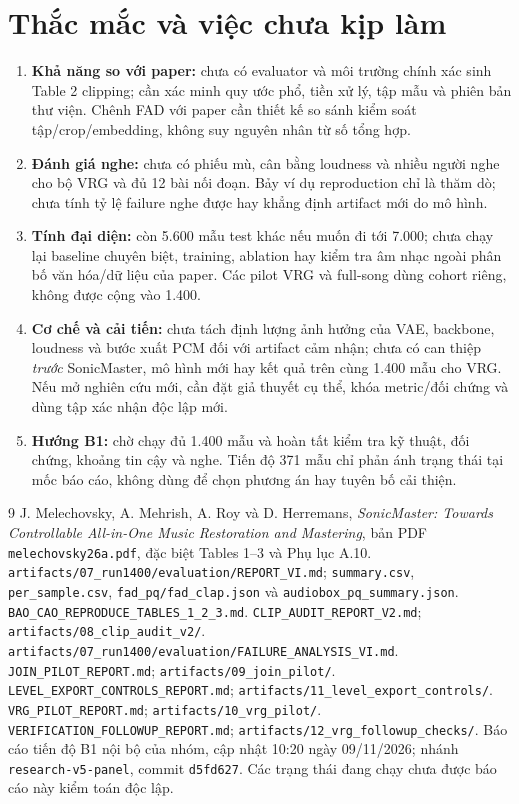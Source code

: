 \documentclass[10pt,a4paper]{article}
\begin{document}
\section{Thắc mắc và việc chưa kịp làm}
\begin{enumerate}
\item \textbf{Khả năng so với paper:} chưa có evaluator và môi trường chính xác sinh Table 2 clipping; cần xác minh quy ước phổ, tiền xử lý, tập mẫu và phiên bản thư viện. Chênh FAD với paper cần thiết kế so sánh kiểm soát tập/crop/embedding, không suy nguyên nhân từ số tổng hợp.
\item \textbf{Đánh giá nghe:} chưa có phiếu mù, cân bằng loudness và nhiều người nghe cho bộ VRG và đủ 12 bài nối đoạn. Bảy ví dụ reproduction chỉ là thăm dò; chưa tính tỷ lệ failure nghe được hay khẳng định artifact mới do mô hình.
\item \textbf{Tính đại diện:} còn 5.600 mẫu test khác nếu muốn đi tới 7.000; chưa chạy lại baseline chuyên biệt, training, ablation hay kiểm tra âm nhạc ngoài phân bố văn hóa/dữ liệu của paper. Các pilot VRG và full-song dùng cohort riêng, không được cộng vào 1.400.
\item \textbf{Cơ chế và cải tiến:} chưa tách định lượng ảnh hưởng của VAE, backbone, loudness và bước xuất PCM đối với artifact cảm nhận; chưa có can thiệp \emph{trước} SonicMaster, mô hình mới hay kết quả trên cùng 1.400 mẫu cho VRG. Nếu mở nghiên cứu mới, cần đặt giả thuyết cụ thể, khóa metric/đối chứng và dùng tập xác nhận độc lập mới.
\item \textbf{Hướng B1:} chờ chạy đủ 1.400 mẫu và hoàn tất kiểm tra kỹ thuật, đối chứng, khoảng tin cậy và nghe. Tiến độ 371 mẫu chỉ phản ánh trạng thái tại mốc báo cáo, không dùng để chọn phương án hay tuyên bố cải thiện.
\end{enumerate}

\renewcommand{\refname}{Tài liệu và dữ liệu đối chiếu}
\begin{thebibliography}{9}\small
{} J. Melechovsky, A. Mehrish, A. Roy và D. Herremans, \emph{SonicMaster: Towards Controllable All-in-One Music Restoration and Mastering}, bản PDF \texttt{melechovsky26a.pdf}, đặc biệt Tables 1--3 và Phụ lục A.10.
 \texttt{artifacts/07\_run1400/evaluation/REPORT\_VI.md}; \texttt{summary.csv}, \texttt{per\_sample.csv}, \texttt{fad\_pq/fad\_clap.json} và \texttt{audiobox\_pq\_summary.json}.
 \texttt{BAO\_CAO\_REPRODUCE\_TABLES\_1\_2\_3.md}.
 \texttt{CLIP\_AUDIT\_REPORT\_V2.md}; \texttt{artifacts/08\_clip\_audit\_v2/}.
 \texttt{artifacts/07\_run1400/evaluation/FAILURE\_ANALYSIS\_VI.md}.
 \texttt{JOIN\_PILOT\_REPORT.md}; \texttt{artifacts/09\_join\_pilot/}.
 \texttt{LEVEL\_EXPORT\_CONTROLS\_REPORT.md}; \texttt{artifacts/11\_level\_export\_controls/}.
 \texttt{VRG\_PILOT\_REPORT.md}; \texttt{artifacts/10\_vrg\_pilot/}.
 \texttt{VERIFICATION\_FOLLOWUP\_REPORT.md}; \texttt{artifacts/12\_vrg\_followup\_checks/}.
 Báo cáo tiến độ B1 nội bộ của nhóm, cập nhật 10:20 ngày 09/11/2026; nhánh \texttt{research-v5-panel}, commit \texttt{d5fd627}. Các trạng thái đang chạy chưa được báo cáo này kiểm toán độc lập.
\end{thebibliography}
\end{document}
